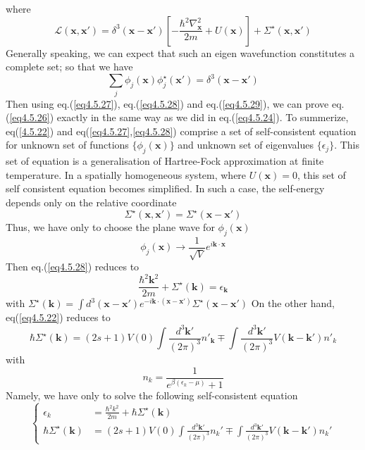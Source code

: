 where
\begin{equation}\label{eq4.5.28}
\mathscr{L}(\mathbf{x},\mathbf{x}')=\delta^3(\mathbf{x}-\mathbf{x}')\left[ -\frac{\hbar^2\nabla^2_\mathbf{x}}{2m}+U(\mathbf{x}) \right]+ \Sigma^\star (\mathbf{x},\mathbf{x}')
\end{equation}
Generally speaking, we can expect that such an eigen wavefunction constitutes a complete set; so that we have 
\begin{equation}\label{eq4.5.29}
\sum_j\phi_j(\mathbf{x}) \phi_j^\star(\mathbf{x}')=\delta^3(\mathbf{x}-\mathbf{x}')
\end{equation}
Then using eq.(\ref{eq4.5.27}), eq.(\ref{eq4.5.28}) and eq.(\ref{eq4.5.29}), we can prove eq.(\ref{eq4.5.26}) exactly in the same way as we did in eq.(\ref{eq4.5.24}).
To summerize, eq(\ref{4.5.22}) and eq(\ref{eq4.5.27},\ref{eq4.5.28}) comprise a set of self-consistent equation for unknown set of functions $\{ \phi_j(\mathbf{x})\}$ and unknown set of eigenvalues $\{ \epsilon_j\}$.
This set of equation is a generalisation of Hartree-Fock approximation at finite temperature.
In a spatially homogeneous system, where $U(\mathbf{x})=0$, this set of self consistent equation becomes simplified.
In such a case, the self-energy depends only on the relative coordinate
\[
\Sigma^\star(\mathbf{x},\mathbf{x}')=\Sigma^\star(\mathbf{x}-\mathbf{x}')
\]
Thus, we have only to choose the plane wave for $\phi_j(\mathbf{x})$
\[
\phi_j(\mathbf{x})\rightarrow \frac{1}{\sqrt{V}}e^{i\mathbf{k} \cdot \mathbf{x}}
\]
Then eq.(\ref{eq4.5.28}) reduces to 
\begin{equation}
\frac{\hbar^2 \mathbf{k}^2}{2m}+\Sigma^\star (\mathbf{k})=\epsilon_{\mathbf{k}}
\end{equation}
with $\Sigma^\star (\mathbf{k})=\int d^3(\mathbf{x}-\mathbf{x}') e^{-i\mathbf{k}\cdot (\mathbf{x}-\mathbf{x'})} \Sigma^\star (\mathbf{x}-\mathbf{x}')$
On the other hand, eq(\ref{eq4.5.22}) reduces to 
\begin{equation}
\hbar \Sigma^\star (\mathbf{k})=(2s+1)V(0)\int \frac{d^3\mathbf{k}'}{(2\pi)^3} n'_\mathbf{k}\mp\int \frac{d^3\mathbf{k}'}{(2\pi)^3} V(\mathbf{k}-\mathbf{k}') n'_k
\end{equation}
with 
\begin{equation}\tag{4.5.30$^\prime$}
n_k=\frac{1}{e^{\beta(\epsilon_k-\mu)}+1}
\end{equation}
Namely, we have only to solve the following self-consistent equation
\begin{equation}\label{eq4.5.31}
\left\{
\begin{aligned}
\epsilon_k&=\frac{\hbar^2 k^2}{2m}+\hbar\Sigma^\star(\mathbf{k})\\
\hbar \Sigma^\star(\mathbf{k})&=(2s+1)V(0)\int\frac{d^3\mathbf{k}'}{(2\pi)^3}n_k'\mp\int\frac{d^3\mathbf{k}'}{(2\pi)^3}V(\mathbf{k}-\mathbf{k}')n_k'
\end{aligned}
\right.
\end{equation}
%




